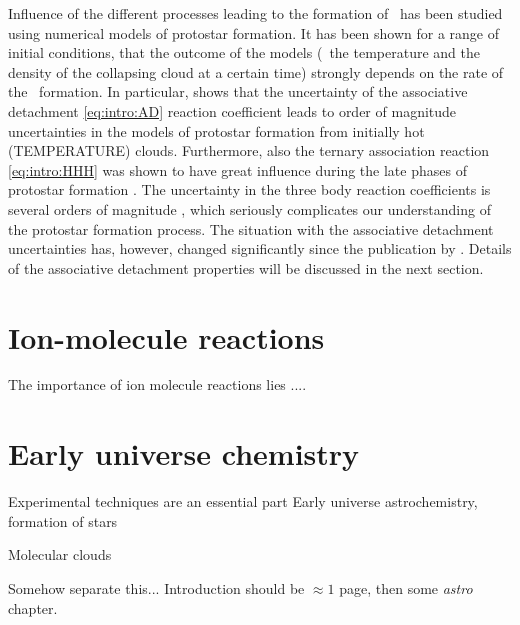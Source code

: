 Influence of the different processes leading to the formation of \Htwo\ 
has been studied using numerical models of protostar formation.
It has been shown for a range of initial conditions, that the outcome
of the models (\ie\ the
temperature and the density of the collapsing cloud at a certain time) strongly
depends on the rate of the \Htwo\ formation. In particular, \cite{glover2006} shows
that the uncertainty of the associative detachment \eqref{eq:intro:AD} reaction
coefficient leads to order of magnitude uncertainties in the models of
protostar formation from initially hot (TEMPERATURE) clouds. Furthermore,
also the ternary association reaction \eqref{eq:intro:HHH} was shown to have
great influence during the late phases of protostar formation \citep{turk2011}.
The uncertainty in the three body reaction coefficients  is several orders
of magnitude \citep{glover2008}, which seriously complicates our understanding
of the protostar formation process.
The situation with the associative detachment uncertainties has, however,
changed significantly since the publication by \cite{glover2006}. Details
of the associative detachment properties will be discussed in the next section.



\section{Ion-molecule reactions}
The importance of ion molecule reactions lies ....


\section{Early universe chemistry}

Experimental techniques are an essential part
Early universe astrochemistry, formation of stars

Molecular clouds

Somehow separate this... Introduction should be $\approx1$ page, then some {\em astro} chapter.

\endgroup
